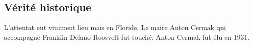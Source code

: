 \documentclass[oneside,12pt]{book}
\begin{document}
\begin{flushleft}
\chapter{Vérité historique}
L'attentat eut vraiment lieu mais en Floride. Le maire Anton Cermak qui accompagné Franklin Delano Roosvelt fut touché. Anton Cermak fut élu en 1931.





\end{flushleft}
\end{document}
